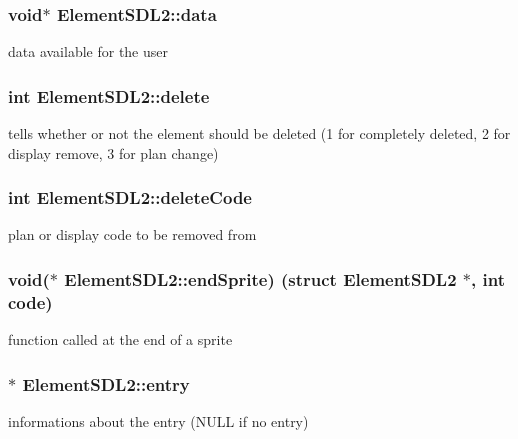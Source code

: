 \subsubsection[{\texorpdfstring{data}{data}}]{\setlength{\rightskip}{0pt plus 5cm}void$\ast$ Element\+S\+D\+L2\+::data}\hypertarget{structElementSDL2_abca7de78cc7e420d98d24a955563c7cc}{}\label{structElementSDL2_abca7de78cc7e420d98d24a955563c7cc}
data available for the user 
\subsubsection[{\texorpdfstring{delete}{delete}}]{\setlength{\rightskip}{0pt plus 5cm}int Element\+S\+D\+L2\+::delete}\hypertarget{structElementSDL2_a59d6b7086533d8d7da883bc882c4ef6d}{}\label{structElementSDL2_a59d6b7086533d8d7da883bc882c4ef6d}
tells whether or not the element should be deleted (1 for completely deleted, 2 for display remove, 3 for plan change) 
\subsubsection[{\texorpdfstring{delete\+Code}{deleteCode}}]{\setlength{\rightskip}{0pt plus 5cm}int Element\+S\+D\+L2\+::delete\+Code}\hypertarget{structElementSDL2_a1f8620d697afd711263d20dd82077cd0}{}\label{structElementSDL2_a1f8620d697afd711263d20dd82077cd0}
plan or display code to be removed from 
\subsubsection[{\texorpdfstring{end\+Sprite}{endSprite}}]{\setlength{\rightskip}{0pt plus 5cm}void($\ast$ Element\+S\+D\+L2\+::end\+Sprite) (struct {\bf Element\+S\+D\+L2} $\ast$, int code)}\hypertarget{structElementSDL2_aa857e06629320966e80bd437050b07e8}{}\label{structElementSDL2_aa857e06629320966e80bd437050b07e8}
function called at the end of a sprite 
\subsubsection[{\texorpdfstring{entry}{entry}}]{$\ast$ Element\+S\+D\+L2\+::entry}\hypertarget{structElementSDL2_a9c99c1c34dcf0e52baaca7a64598bd8a}{}\label{structElementSDL2_a9c99c1c34dcf0e52baaca7a64598bd8a}
informations about the entry (N\+U\+LL if no entry) 
